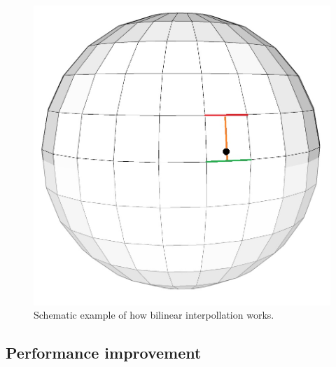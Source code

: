 \begin{figure}[H]
\centering
  \includegraphics[width=\textwidth/2]{../images/3Dimages/globe.jpg}
  \caption{Schematic example of how bilinear interpollation works.}
  \label{fig:globe}
\end{figure}

\subsection{Performance improvement}
